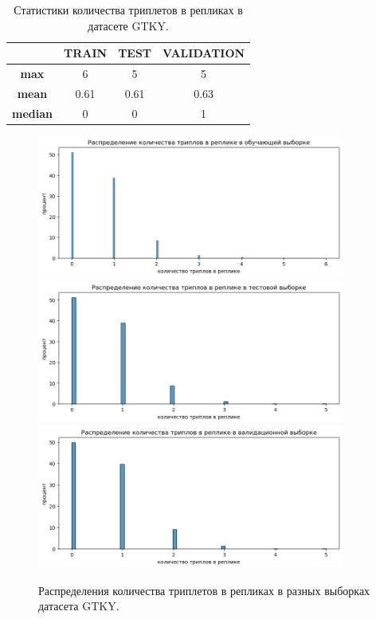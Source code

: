 \begin{table}[!ht]
\centering
\begin{tabular}{c|c c c}
    \hline
     & TRAIN & TEST & VALIDATION \\
    \hline
    \hline
    \textbf{max} & 6 & 5 & 5 \\
    \hline
    \textbf{mean} & 0.61 & 0.61 & 0.63 \\
    \hline
    \textbf{median} & 0 & 0 & 1 \\
    \hline
\end{tabular}
\caption{Статистики количества триплетов в репликах в датасете GTKY.}
\label{table:triple_count_stats}
\end{table}

\begin{figure}[!ht]
    \centering
    \includegraphics[width=0.9\textwidth]{images/triple_distr_train.png}
    \includegraphics[width=0.9\textwidth]{images/triple_distr_test.png}
    \includegraphics[width=0.9\textwidth]{images/triple_distr_val.png}
    \caption{Распределения количества триплетов в репликах в разных выборках датасета GTKY.}
    \label{fig:triple_distr}
\end{figure}

